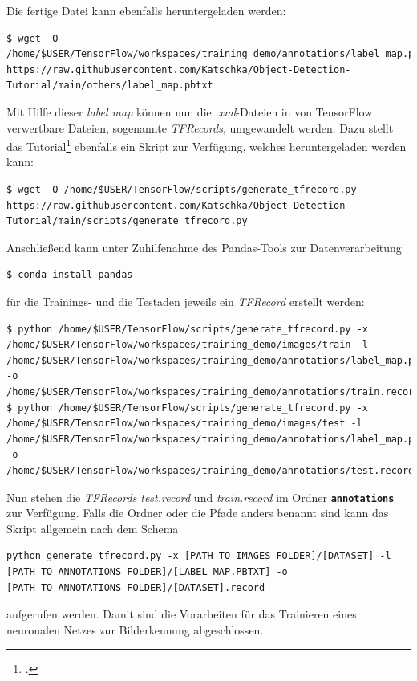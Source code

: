 \documentclass[12pt, oneside]{article}
\begin{document}
Die fertige Datei kann ebenfalls heruntergeladen werden:

\begin{verbatim}
$ wget -O /home/$USER/TensorFlow/workspaces/training_demo/annotations/label_map.pbtxt https://raw.githubusercontent.com/Katschka/Object-Detection-Tutorial/main/others/label_map.pbtxt
\end{verbatim}
Mit Hilfe dieser \textit{label map} können nun die \textit{.xml}-Dateien in von TensorFlow verwertbare Dateien, sogenannte \textit{TFRecords}, umgewandelt werden. Dazu stellt das Tutorial\footcite{TFRecords} ebenfalls ein Skript zur Verfügung, welches heruntergeladen werden kann:

\begin{verbatim}
$ wget -O /home/$USER/TensorFlow/scripts/generate_tfrecord.py https://raw.githubusercontent.com/Katschka/Object-Detection-Tutorial/main/scripts/generate_tfrecord.py
\end{verbatim}
Anschließend kann unter Zuhilfenahme des Pandas-Tools zur Datenverarbeitung

\begin{verbatim}
$ conda install pandas
\end{verbatim}    
für die Trainings- und die Testaden jeweils ein \textit{TFRecord} erstellt werden:

\begin{verbatim}    
$ python /home/$USER/TensorFlow/scripts/generate_tfrecord.py -x /home/$USER/TensorFlow/workspaces/training_demo/images/train -l /home/$USER/TensorFlow/workspaces/training_demo/annotations/label_map.pbtxt -o /home/$USER/TensorFlow/workspaces/training_demo/annotations/train.record
$ python /home/$USER/TensorFlow/scripts/generate_tfrecord.py -x /home/$USER/TensorFlow/workspaces/training_demo/images/test -l /home/$USER/TensorFlow/workspaces/training_demo/annotations/label_map.pbtxt -o /home/$USER/TensorFlow/workspaces/training_demo/annotations/test.record
\end{verbatim}
Nun stehen die \textit{TFRecords test.record} und \textit{train.record} im Ordner \textbf{\texttt{annotations}} zur Verfügung. Falls die Ordner oder die Pfade anders benannt sind kann das Skript allgemein nach dem Schema

\begin{verbatim}  
python generate_tfrecord.py -x [PATH_TO_IMAGES_FOLDER]/[DATASET] -l [PATH_TO_ANNOTATIONS_FOLDER]/[LABEL_MAP.PBTXT] -o [PATH_TO_ANNOTATIONS_FOLDER]/[DATASET].record
\end{verbatim}
aufgerufen werden. Damit sind die Vorarbeiten für das Trainieren eines neuronalen Netzes zur Bilderkennung abgeschlossen.
\end{document}
